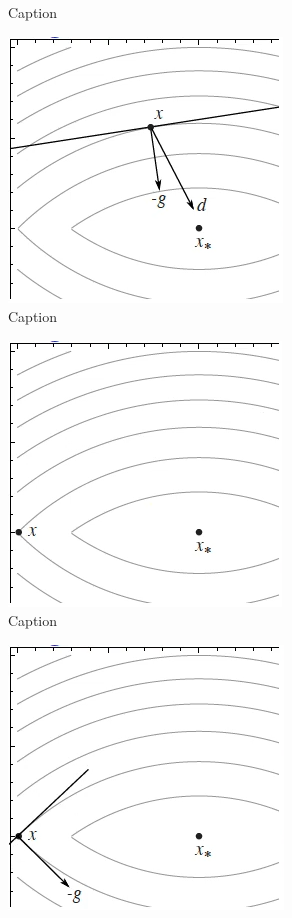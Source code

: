 \begin{figure}
\begin{subfigure}{0.31\textwidth}
        \caption{Caption}
        \label{fig:sub_example3}
    \end{subfigure}
    \begin{subfigure}{0.31\textwidth}
        \centering
        \includegraphics[scale=0.35]{figures/2/sub-example/sub_example4.png}
        \caption{Caption}
        \label{fig:sub_example4}
    \end{subfigure}
    \begin{subfigure}{0.31\textwidth}
        \centering
        \includegraphics[scale=0.35]{figures/2/sub-example/sub_example5.png}
        \caption{Caption}
        \label{fig:sub_example5}
    \end{subfigure}
    \begin{subfigure}{0.31\textwidth}
        \centering
        \includegraphics[scale=0.35]{figures/2/sub-example/sub_example6.png}

\end{subfigure}
\end{figure}
